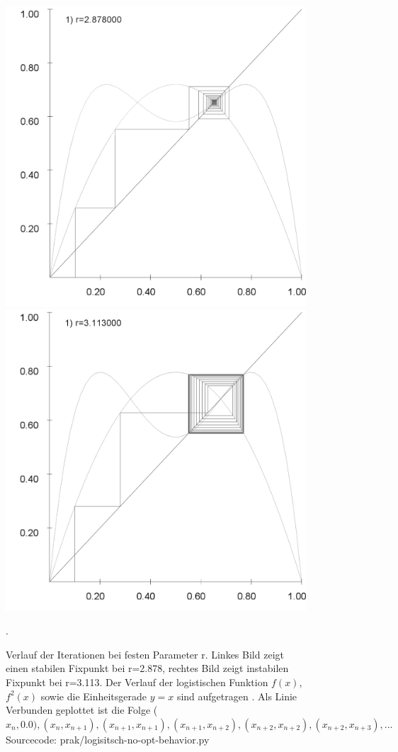 \documentclass{scrartcl}
\begin{document}
\begin{figure}
\centering
\includegraphics[scale=0.2]{fixpunkt-2878}
\includegraphics[scale=0.2]{fixpunkt-311}
\caption{Verlauf der Iterationen bei festen Parameter r. Linkes Bild zeigt einen stabilen Fixpunkt bei r=2.878, rechtes Bild zeigt instabilen Fixpunkt bei r=3.113. Der Verlauf der logistischen Funktion $f(x)$, $f^2(x)$ sowie die Einheitsgerade $y=x$ sind aufgetragen . Als Linie Verbunden geplottet ist die Folge ($x_n, 0.0), (x_n, x_{n+1}), (x_{n+1}, x_{n+1}), (x_{n+1}, x_{n+2}), (x_{n+2}, x_{n+2}), (x_{n+2}, x_{n+3}), ...$ Sourcecode: prak/logisitsch-no-opt-behavior.py}. 
\end{figure}
\end{document}
